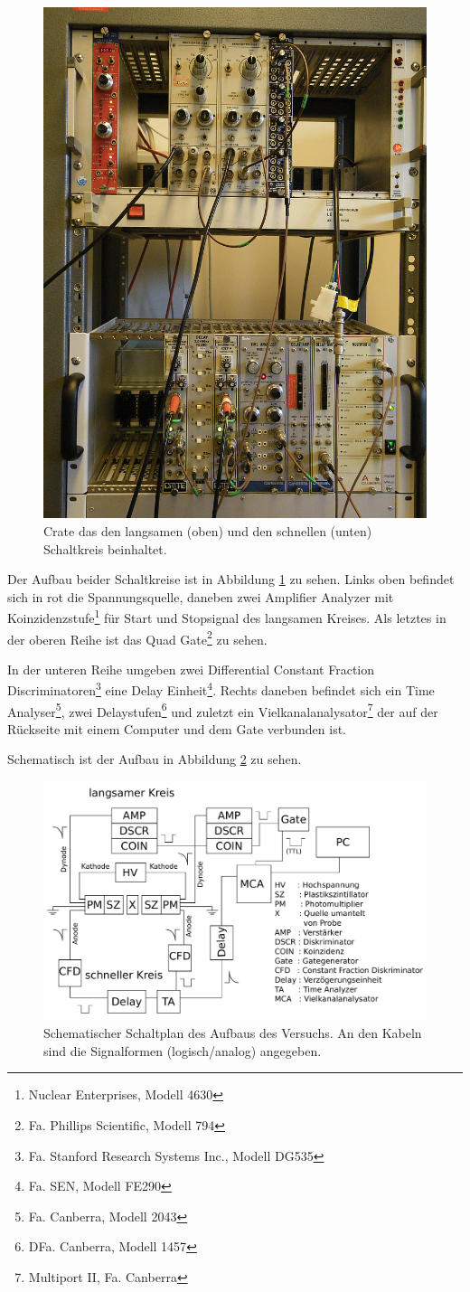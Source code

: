 \documentclass[a4paper,12pt]{article}
\begin{document}
\begin{figure}[htb]
		\centering
		\includegraphics[width=.5\textwidth]{aufbau.jpg}
		\caption{Crate das den langsamen (oben) und den schnellen (unten) Schaltkreis beinhaltet.}
		\label{fig:aufbau}
\end{figure}

Der Aufbau beider Schaltkreise ist in Abbildung \ref{fig:aufbau} zu sehen.
Links oben befindet sich in rot die Spannungsquelle, daneben zwei Amplifier Analyzer mit Koinzidenzstufe\footnote{Nuclear Enterprises, Modell 4630} für Start und Stopsignal des langsamen Kreises.
Als letztes in der oberen Reihe ist das Quad Gate\footnote{Fa. Phillips Scientific, Modell 794} zu sehen.

In der unteren Reihe umgeben zwei Differential Constant Fraction Discriminatoren\footnote{Fa. Stanford Research Systems Inc., Modell DG535} eine Delay Einheit\footnote{Fa. SEN, Modell FE290}.
Rechts daneben befindet sich ein Time Analyser\footnote{Fa. Canberra, Modell 2043}, zwei Delaystufen\footnote{DFa. Canberra, Modell 1457} und zuletzt ein Vielkanalanalysator\footnote{Multiport II, Fa. Canberra}
 der auf der Rückseite mit einem Computer und dem Gate verbunden ist.

Schematisch ist der Aufbau in Abbildung \ref{fig:schaltplan} zu sehen.
\begin{figure}[htb]
		\centering
		\includegraphics[width=1.0\textwidth]{Schaltplan_custom.pdf}
		\caption{Schematischer Schaltplan des Aufbaus des Versuchs.
		An den Kabeln sind die Signalformen (logisch/analog) angegeben.}
		\label{fig:schaltplan}
\end{figure}
\end{document}
